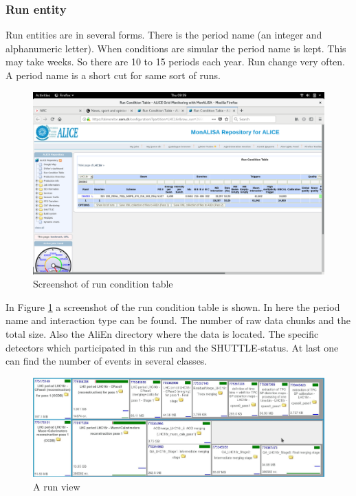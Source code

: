 \subsubsection{Run entity}
Run entities are in several forms. There is the period name (an integer and alphanumeric letter). When conditions are simular the period name is kept. This may take weeks. So there are 10 to 15 periods each year. Run change very often. A period name is a short cut for same sort of runs.
\begin{figure}
  \begin{center}
    \includegraphics[scale=0.15]{./images/run_entity.png}
    \caption{Screenshot of run condition table}
    \label{fig:run_con_table}
  \end{center}
\end{figure}

In Figure \ref{fig:run_con_table} a screenshot of the run condition table is shown. In here the period name and interaction type can be found. The number of raw data chunks and the total size. Also the AliEn directory where the data is located. The specific detectors which participated in this run and the SHUTTLE-status. At last one can find the number of events in several classes.

\begin{figure}
  \begin{center}
    \includegraphics[scale=0.2]{./images/run_view.jpg}
    \caption{A run view}
    \label{fig:run_view}
  \end{center}
\end{figure}


